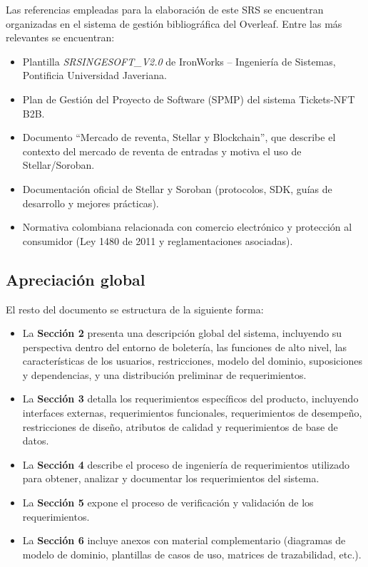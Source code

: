 \documentclass[12pt,letterpaper]{article}
\begin{document}
Las referencias empleadas para la elaboración de este SRS se encuentran
organizadas en el sistema de gestión bibliográfica del Overleaf. Entre las más relevantes se encuentran:

\begin{itemize}
    \item Plantilla \textit{SRSINGESOFT\_V2.0} de IronWorks -- Ingeniería de
          Sistemas, Pontificia Universidad Javeriana.
    \item Plan de Gestión del Proyecto de Software (SPMP) del sistema
          Tickets-NFT B2B.
    \item Documento ``Mercado de reventa, Stellar y Blockchain'', que describe
          el contexto del mercado de reventa de entradas y motiva el uso de
          Stellar/Soroban.
    \item Documentación oficial de Stellar y Soroban (protocolos, SDK,
          guías de desarrollo y mejores prácticas).
    \item Normativa colombiana relacionada con comercio electrónico y
          protección al consumidor (Ley 1480 de 2011 y reglamentaciones
          asociadas).
\end{itemize}

\subsection{Apreciación global}

El resto del documento se estructura de la siguiente forma:

\begin{itemize}
    \item La \textbf{Sección 2} presenta una descripción global del sistema,
          incluyendo su perspectiva dentro del entorno de boletería, las
          funciones de alto nivel, las características de los usuarios,
          restricciones, modelo del dominio, suposiciones y dependencias, y una
          distribución preliminar de requerimientos.
    \item La \textbf{Sección 3} detalla los requerimientos específicos del
          producto, incluyendo interfaces externas, requerimientos funcionales,
          requerimientos de desempeño, restricciones de diseño, atributos de
          calidad y requerimientos de base de datos.
    \item La \textbf{Sección 4} describe el proceso de ingeniería de
          requerimientos utilizado para obtener, analizar y documentar los
          requerimientos del sistema.
    \item La \textbf{Sección 5} expone el proceso de verificación y
          validación de los requerimientos.
    \item La \textbf{Sección 6} incluye anexos con material complementario
          (diagramas de modelo de dominio, plantillas de casos de uso, matrices
          de trazabilidad, etc.).
\end{itemize}
\end{document}
